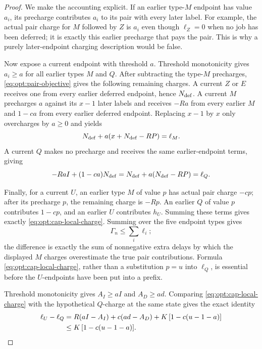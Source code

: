 \begin{proof}
We make the accounting explicit.  If an earlier type-$M$ endpoint has value
$a_i$, its precharge contributes $a_i$ to its pair with every later label.
For example, the actual pair charge for $M$ followed by $Z$ is $a_i$ even
though $\ell_Z=0$ when no job has been deferred; it is exactly this earlier
precharge that pays the pair.  This is why a purely later-endpoint charging
description would be false.

Now expose a current endpoint with threshold $a$.  Threshold monotonicity
gives $a_i\ge a$ for all earlier types $M$ and $Q$.  After subtracting the
type-$M$ precharges, \cref{eq:opt:pair-objective} gives the following
remaining charges.  A current $Z$ or $E$ receives one from every earlier
deferred endpoint, hence $N_{\rm def}$.  A current $M$ precharges $a$ against
its $x-1$ later labels and receives
$-Ra$ from every earlier $M$ and $1-ca$ from every earlier deferred
endpoint.  Replacing $x-1$ by $x$ only overcharges by $a\ge0$ and yields
\[
 N_{\rm def}+a(x+N_{\rm def}-RP)=\ell_M.
\]
A current $Q$ makes no precharge and receives the same earlier-endpoint
terms, giving
\[
 -RaI+(1-ca)N_{\rm def}
 =N_{\rm def}+a(N_{\rm def}-RP)=\ell_Q.
\]

Finally, for a current $U$, an earlier type $M$ of value $p$ has actual pair
charge $-cp$; after its precharge $p$, the remaining charge is $-Rp$.
An earlier $Q$ of value $p$ contributes $1-cp$, and an earlier $U$
contributes $h_U$.  Summing these terms gives exactly
\cref{eq:opt:cap-local-charge}.
Summing over the five endpoint types gives
\begin{equation}
 \Gamma_n\le\sum_i\ell_i;
 \label{eq:opt:pair-allocation-dominates}
\end{equation}
the difference is exactly the sum of nonnegative extra delays by which the
displayed $M$ charges overestimate the true pair contributions.
Formula
\eqref{eq:opt:cap-local-charge}, rather than a substitution $p=u$ into
$\ell_Q$, is essential before the $U$-endpoints have been put into a prefix.

Threshold monotonicity gives $A_I\ge aI$ and $A_D\ge ad$.  Comparing
\eqref{eq:opt:cap-local-charge} with the hypothetical $Q$-charge at the
same state gives the exact identity
\begin{align}
 \ell_U-\ell_Q
 &=R(aI-A_I)+c(ad-A_D)
   +K\,[1-c(u-1-a)]
 \notag\\
 &\le K\,[1-c(u-1-a)].
 \label{eq:opt:cap-versus-q}
\end{align}
\end{proof}

